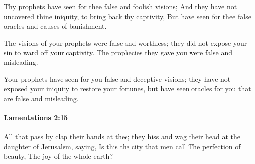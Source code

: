 			\begin{versebox}
					\item[BHS] 
					\item[LXX] 
					\item[ASV] Thy prophets have seen for thee false and foolish visions; And they have not uncovered thine iniquity, to bring back thy captivity, But have seen for thee false oracles and causes of banishment.
					\item[NIV] The visions of your prophets were false and worthless; they did not expose your sin to ward off your captivity. The prophecies they gave you were false and misleading.
					\item[NRSV] Your prophets have seen for you false and deceptive visions; they have not exposed your iniquity to restore your fortunes, but have seen oracles for you that are false and misleading.
			\end{versebox}

		\paragraph{Lamentations 2:15} %
			\label{LAMENTATIONS-2-15}

			All that pass by clap their hands at thee; they hiss and wag their head at the daughter of Jerusalem, saying, Is this the city that men call The perfection of beauty, The joy of the whole earth?


